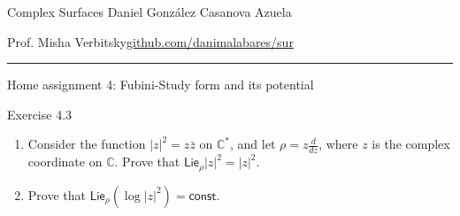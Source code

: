
\setcounter{secnumdepth}{2}



\begin{minipage}{\textwidth}
	\begin{minipage}{1\textwidth}
		Complex Surfaces \hfill Daniel González Casanova Azuela
		
		{\small Prof. Misha Verbitsky\hfill\href{https://github.com/danimalabares/sur}{github.com/danimalabares/sur}}
	\end{minipage}
\end{minipage}\vspace{.2cm}\hrule

\vspace{10pt}
{\huge Home assignment 4: Fubini-Study form and its potential}

\begin{thing4}{Exercise 4.3}\label{exer:4.3}\leavevmode
\begin{enumerate}[label=(\alph*)]
\item Consider the function \(|z|^2=z\bar{z}\) on \(\mathbb{C}^*\), and let \(\rho=z \frac{d}{dz}\), where \(z\) is the complex coordinate on \(\mathbb{C}\). Prove that \(\mathsf{Lie}_\rho |z|^2=|z|^2\).
\item Prove that \(\mathsf{Lie}_\rho(\operatorname{log} |z|^2)=\mathsf{const}\).
\end{enumerate}
\end{thing4}

